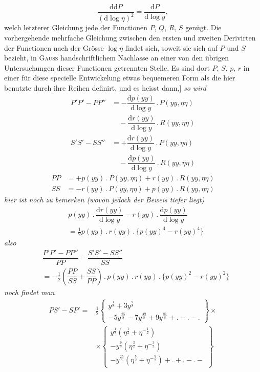 \[
\dfrac{\mathrm d\mathrm dP}{(\mathrm d\log\eta)^2}
 =\dfrac{\mathrm dP}{\mathrm d\log y},
\]
welch letzterer Gleichung jede der Functionen $P$, $Q$, $R$, $S$ genügt.
Die vorhergehende mehrfache Gleichung zwischen den ersten und zweiten
Derivirten der Functionen nach der Grösse $\log\eta$ findet sich, soweit sie
sich auf $P$ und $S$ bezieht, in \textsc{Gauss} handschriftlichem Nachlasse an
einer von den übrigen Untersuchungen dieser Functionen getrennten Stelle.
Es sind dort $P$, $S$, $p$, $r$ in einer für diese specielle Entwickelung etwas
bequemeren Form als die hier benutzte durch ihre Reihen definirt, und es
heisst dann,] \textit{so wird}
\[
\begin{aligned}
P'P'-PP''&=-\dfrac{\mathrm dp(yy)}{\mathrm d\log y}\mathbin{.}P(yy,\eta\eta)\\[5pt]&\quad{}-
\dfrac{\mathrm dr(yy)}{\mathrm d\log y}\mathbin{.}R(yy,\eta\eta)\\[9pt]
S'S'-SS''&=+\dfrac{\mathrm dr(yy)}{\mathrm d\log y}\mathbin{.}P(yy,\eta\eta)\\[5pt]&\quad{}-
\dfrac{\mathrm dp(yy)}{\mathrm d\log y}\mathbin{.}R(yy,\eta\eta)
\end{aligned}
\]
\[
\begin{aligned}
PP&=+p(yy)\mathbin{.}P(yy,\eta\eta)+r(yy)\mathbin{.}R(yy,\eta\eta)\\
SS&=-r(yy)\mathbin{.}P(yy,\eta\eta)+p(yy)\mathbin{.}R(yy,\eta\eta)
\end{aligned}
\]
\textit{hier ist noch zu bemerken (wovon jedoch der Beweis tiefer liegt)}
\[
\begin{aligned}&p(yy)\mathbin{.}\dfrac{\mathrm dr(yy)}{\mathrm d\log y}
-r(yy)\mathbin{.}\dfrac{\mathrm dp(yy)}{\mathrm d\log y}
\\[6pt]&=\tfrac12p(yy)\mathbin{.}r(yy)\mathbin{.}\{p(yy)^4-r(yy)^4\}\end{aligned}
\]
\textit{also}
\[
\begin{aligned}&\dfrac{P'P'-PP''}{PP}-\dfrac{S'S'-SS''}{SS}
\\[6pt]&=-\tfrac12\left(\dfrac{PP}{SS}+\dfrac{SS}{PP}\right)
\mathbin{.}p(yy)\mathbin{.}r(yy)\mathbin{.}\{p(yy)^2-r(yy)^2\}\end{aligned}
\]
\textit{noch findet man}
\[
\begin{aligned}
PS'-SP'={}&\tfrac12\left\{\begin{gathered}y^{\frac18}+3y^{\frac98}\\[3pt]-5y^{\frac{25}8}
 -7y^{\frac{49}8}+9y^{\frac{81}8}+\mathord{.}-\mathord{.}-\mathord{.}\end{gathered}\right\}\times\\[10pt]
&\times\left\{\begin{gathered}y^{\frac18}(\eta^{\frac12}+\eta^{-\frac12})
\\[3pt]-y^{\frac98}(\eta^{\frac32}+\eta^{-\frac32})
\\[3pt]-y^{\frac{25}8}(\eta^{\frac52}+\eta^{-\frac52})
 +\mathord{.}+\mathord{.}-\mathord{.}-\end{gathered}\right\}
\end{aligned}
\]
